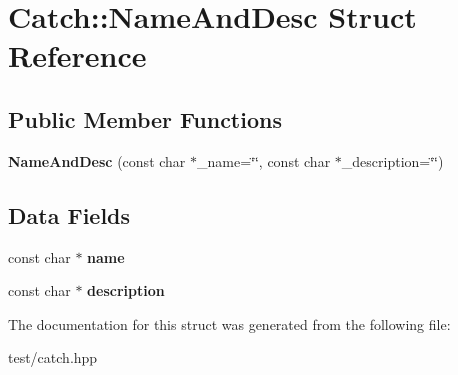 \hypertarget{structCatch_1_1NameAndDesc}{}\section{Catch\+:\+:Name\+And\+Desc Struct Reference}
\label{structCatch_1_1NameAndDesc}
\subsection*{Public Member Functions}
\begin{DoxyCompactItemize}
\item 
{\bfseries Name\+And\+Desc} (const char $\ast$\+\_\+name=\char`\"{}\char`\"{}, const char $\ast$\+\_\+description=\char`\"{}\char`\"{})\hypertarget{structCatch_1_1NameAndDesc_a189ceb9942fb5f6635140d6a09fc843a}{}\label{structCatch_1_1NameAndDesc_a189ceb9942fb5f6635140d6a09fc843a}

\end{DoxyCompactItemize}
\subsection*{Data Fields}
\begin{DoxyCompactItemize}
\item 
const char $\ast$ {\bfseries name}\hypertarget{structCatch_1_1NameAndDesc_a374b4ed8be3cf98be20ebde5273bde51}{}\label{structCatch_1_1NameAndDesc_a374b4ed8be3cf98be20ebde5273bde51}

\item 
const char $\ast$ {\bfseries description}\hypertarget{structCatch_1_1NameAndDesc_a3463a23ff65ce494fc380452b57b7970}{}\label{structCatch_1_1NameAndDesc_a3463a23ff65ce494fc380452b57b7970}

\end{DoxyCompactItemize}


The documentation for this struct was generated from the following file\+:\begin{DoxyCompactItemize}
\item 
test/catch.\+hpp\end{DoxyCompactItemize}
